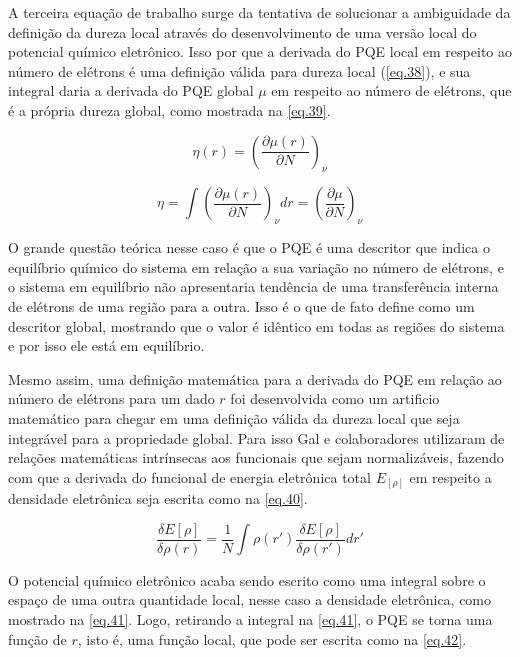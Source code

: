 \documentclass[a4paper,11pt]{refart}
\begin{document}
A terceira equação de trabalho surge da tentativa de solucionar a ambiguidade da definição da dureza local através do desenvolvimento de uma versão local do potencial químico eletrônico. Isso por que a derivada do PQE local em respeito ao número de elétrons é uma definição válida para dureza local (\autoref{eq.38}), e sua integral daria a derivada do PQE global $\mu$ em respeito ao número de elétrons, que é a própria dureza global, como mostrada na \autoref{eq.39}. 

\begin{equation}
\eta(r) = \left( \frac{\partial \mu(r)}{\partial N } \right)_\nu
\label{eq.38}
\end{equation}

\begin{equation}
\eta =  \int \left( \frac{\partial \mu(r)}{\partial N } \right)_\nu dr = \left( \frac{\partial \mu}{\partial N } \right)_\nu
\label{eq.39}
\end{equation}

O grande questão teórica nesse caso é que o PQE é uma descritor que indica o equilíbrio químico do sistema em relação a sua variação no número de elétrons, e o sistema em equilíbrio não apresentaria tendência de uma transferência interna de elétrons de uma região para a outra. Isso é o que de fato define como um descritor global, mostrando que o valor é idêntico em todas as regiões do sistema e por isso ele está em equilíbrio. 

Mesmo assim, uma definição matemática para a derivada do PQE em relação ao número de elétrons para um dado $r$ foi desenvolvida como um artificio matemático para chegar em uma definição válida da dureza local que seja integrável para a propriedade global. Para isso Gal e colaboradores utilizaram de relações matemáticas intrínsecas aos funcionais que sejam normalizáveis\cite{gal2011new}, fazendo com que a derivada do funcional de energia eletrônica total $E_[\rho]$ em respeito a densidade eletrônica seja escrita como na \autoref{eq.40}. 


\begin{equation}
\frac{\delta E[\rho]}{\delta \rho(r)} = \frac{1}{N} \int \rho(r') \frac{\delta E[\rho]}{\delta \rho(r')} dr'
\label{eq.40}
\end{equation}

O potencial químico eletrônico acaba sendo escrito como uma integral sobre o espaço de uma outra quantidade local, nesse caso a densidade eletrônica, como mostrado na \autoref{eq.41}. Logo, retirando a integral na \autoref{eq.41}, o PQE se torna uma função de $r$, isto é, uma função local, que pode ser escrita como na \autoref{eq.42}. 
\end{document}
